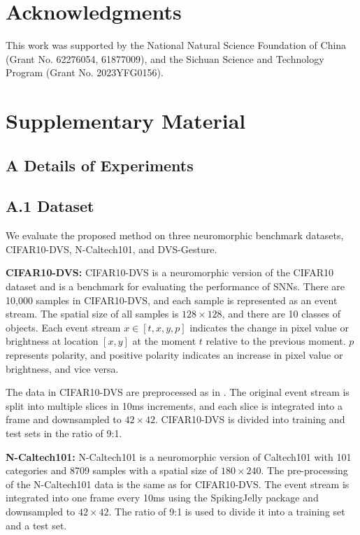 \documentclass[letterpaper]{article} %
\begin{document}
\section{Acknowledgments}
This work was supported by the National Natural Science Foundation of China (Grant No. 62276054, 61877009), and the Sichuan Science and Technology Program (Grant No. 2023YFG0156).

\appendix
\section{Supplementary Material}
\label{Supplementary Material}
\subsection{A Details of Experiments}
\subsection{A.1 Dataset}
We evaluate the proposed method on three neuromorphic benchmark datasets, CIFAR10-DVS, N-Caltech101, and DVS-Gesture.

\textbf{CIFAR10-DVS:} CIFAR10-DVS \cite{CIFAR10-DVS} is a neuromorphic version of the CIFAR10 dataset and is a benchmark for evaluating the performance of SNNs. There are 10,000 samples in CIFAR10-DVS, and each sample is represented as an event stream. The spatial size of all samples is $128 \times 128$, and there are 10 classes of objects. Each event stream $x \in [t,x,y,p]$ indicates the change in pixel value or brightness at location $[x,y]$ at the moment $t$ relative to the previous moment. $p$ represents polarity, and positive polarity indicates an increase in pixel value or brightness, and vice versa.

The data in CIFAR10-DVS are preprocessed as in \cite{MLF}. The original event stream is split into multiple slices in 10ms increments, and each slice is integrated into a frame and downsampled to $42 \times 42$. CIFAR10-DVS is divided into training and test sets in the ratio of 9:1.

\textbf{N-Caltech101:} N-Caltech101 \cite{N-Caltech101} is a neuromorphic version of Caltech101 with 101 categories and 8709 samples with a spatial size of $180 \times 240$. The pre-processing of the N-Caltech101 data is the same as for CIFAR10-DVS. The event stream is integrated into one frame every 10ms using the SpikingJelly package \cite{SpikingJelly} and downsampled to $42 \times 42$. The ratio of 9:1 is used to divide it into a training set and a test set.
\end{document}
